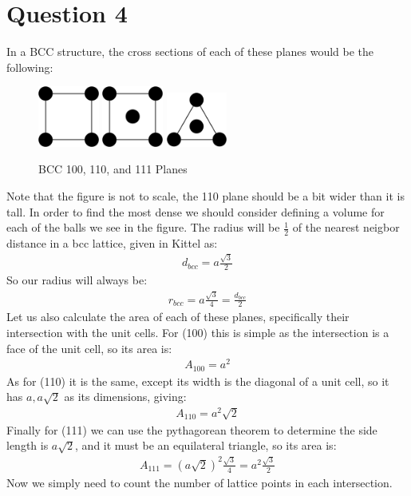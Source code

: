 \documentclass[12pt]{article}
\begin{document}
\section*{Question 4}
In a BCC structure, the cross sections of each of these planes would be the following:
\begin{figure}[H]
  \centering
  \includegraphics[width=2cm]{bcc100}\quad
  \includegraphics[width=2cm]{bcc110}\quad
  \includegraphics[width=2cm]{bcc111}
  \caption{BCC 100, 110, and 111 Planes}
  \label{fig:n}
\end{figure}
Note that the figure is not to scale, the 110 plane should be a bit wider than it is tall. In order to find the most dense we should consider defining a volume for each of the balls we see in the figure. The radius will be $\frac{1}{2}$ of the nearest neigbor distance in a bcc lattice, given in Kittel as:
\begin{align*}
  d_{bcc}=a\frac{\sqrt{3}}{2}
\end{align*}
So our radius will always be:
\begin{align*}
  r_{bcc}=a\frac{\sqrt{3}}{4}=\frac{d_{bcc}}{2}
\end{align*}
Let us also calculate the area of each of these planes, specifically their intersection with the unit cells. For (100) this is simple as the intersection is a face of the unit cell, so its area is:
\begin{align*}
  A_{100}=a^2
\end{align*}
As for (110) it is the same, except its width is the diagonal of a unit cell, so it has $a,a\sqrt{2}$ as its dimensions, giving:
\begin{align*}
  A_{110}=a^2\sqrt{2}
\end{align*}
Finally for (111) we can use the pythagorean theorem to determine the side length is $a\sqrt{2}$, and it must be an equilateral triangle, so its area is:
\begin{align*}
  A_{111}=(a\sqrt{2})^2\frac{\sqrt{3}}{4}=a^2\frac{\sqrt{3}}{2}
\end{align*}
Now we simply need to count the number of lattice points in each intersection.
\end{document}
